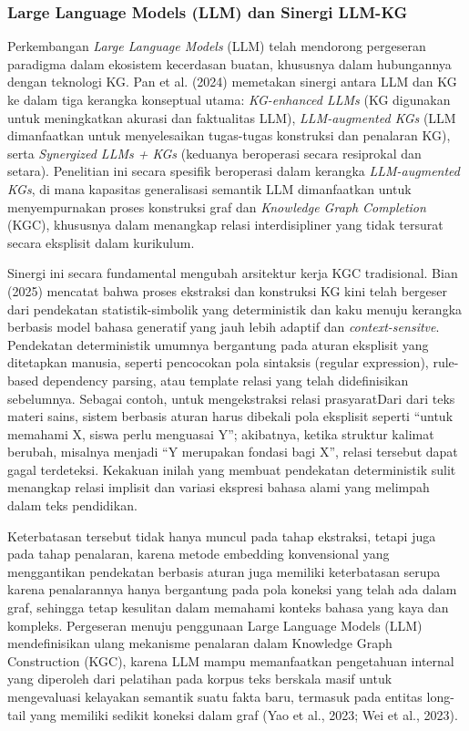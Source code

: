 \documentclass[
]{article}
\begin{document}
\hypertarget{large-language-models-llm-dan-sinergi-llm-kg}{%
\subsubsection{Large Language Models (LLM) dan Sinergi
LLM-KG}\label{large-language-models-llm-dan-sinergi-llm-kg}}

Perkembangan \emph{Large Language Models} (LLM) telah mendorong
pergeseran paradigma dalam ekosistem kecerdasan buatan, khususnya dalam
hubungannya dengan teknologi KG. Pan et al. (2024) memetakan sinergi
antara LLM dan KG ke dalam tiga kerangka konseptual utama:
\emph{KG-enhanced LLMs} (KG digunakan untuk meningkatkan akurasi dan
faktualitas LLM), \emph{LLM-augmented KGs} (LLM dimanfaatkan untuk
menyelesaikan tugas-tugas konstruksi dan penalaran KG), serta
\emph{Synergized LLMs + KGs} (keduanya beroperasi secara resiprokal dan
setara). Penelitian ini secara spesifik beroperasi dalam kerangka
\emph{LLM-augmented KGs}, di mana kapasitas generalisasi semantik LLM
dimanfaatkan untuk menyempurnakan proses konstruksi graf dan
\emph{Knowledge Graph Completion} (KGC), khususnya dalam menangkap
relasi interdisipliner yang tidak tersurat secara eksplisit dalam
kurikulum.

Sinergi ini secara fundamental mengubah arsitektur kerja KGC
tradisional. Bian (2025) mencatat bahwa proses ekstraksi dan konstruksi
KG kini telah bergeser dari pendekatan statistik-simbolik yang
deterministik dan kaku menuju kerangka berbasis model bahasa generatif
yang jauh lebih adaptif dan \emph{context-sensitve}. Pendekatan
deterministik umumnya bergantung pada aturan eksplisit yang ditetapkan
manusia, seperti pencocokan pola sintaksis (regular expression),
rule-based dependency parsing, atau template relasi yang telah
didefinisikan sebelumnya. Sebagai contoh, untuk mengekstraksi relasi
prasyaratDari dari teks materi sains, sistem berbasis aturan harus
dibekali pola eksplisit seperti ``untuk memahami X, siswa perlu
menguasai Y''; akibatnya, ketika struktur kalimat berubah, misalnya
menjadi ``Y merupakan fondasi bagi X'', relasi tersebut dapat gagal
terdeteksi. Kekakuan inilah yang membuat pendekatan deterministik sulit
menangkap relasi implisit dan variasi ekspresi bahasa alami yang
melimpah dalam teks pendidikan.

Keterbatasan tersebut tidak hanya muncul pada tahap ekstraksi, tetapi
juga pada tahap penalaran, karena metode embedding konvensional yang
menggantikan pendekatan berbasis aturan juga memiliki keterbatasan
serupa karena penalarannya hanya bergantung pada pola koneksi yang telah
ada dalam graf, sehingga tetap kesulitan dalam memahami konteks bahasa
yang kaya dan kompleks. Pergeseran menuju penggunaan Large Language
Models (LLM) mendefinisikan ulang mekanisme penalaran dalam Knowledge
Graph Construction (KGC), karena LLM mampu memanfaatkan pengetahuan
internal yang diperoleh dari pelatihan pada korpus teks berskala masif
untuk mengevaluasi kelayakan semantik suatu fakta baru, termasuk pada
entitas long-tail yang memiliki sedikit koneksi dalam graf (Yao et al.,
2023; Wei et al., 2023).
\end{document}
